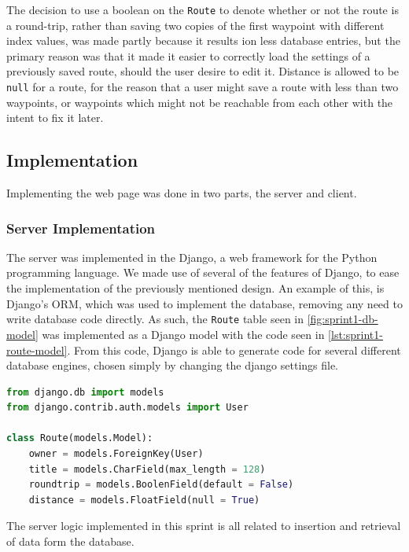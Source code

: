 The decision to use a boolean on the \texttt{Route} to denote whether or not the route is a round-trip, rather than saving two copies of the first waypoint with different index values, was made partly because it results ion less database entries, but the primary reason was that it made it easier to correctly load the settings of a previously saved route, should the user desire to edit it. Distance is allowed to be \texttt{null} for a route, for the reason that a user might save a route with less than two waypoints, or waypoints which might not be reachable from each other with the intent to fix it later.

\subsection{Implementation}

Implementing the web page was done in two parts, the server and client.

\subsubsection{Server Implementation}

The server was implemented in the Django\cite{djangoproject}, a web framework for the Python programming language. We made use of several of the features of Django, to ease the implementation of the previously mentioned design. An example of this, is Django's \ac{ORM}, which was used to implement the database, removing any need to write database code directly. As such, the \texttt{Route} table seen in \autoref{fig:sprint1-db-model} was implemented as a Django model with the code seen in \autoref{lst:sprint1-route-model}. From this code, Django is able to generate code for several different database engines, chosen simply by changing the django settings file.

\begin{lstlisting}[language=Python,label={lst:sprint1-route-model},caption={Sprint 1 "Route" Model}]
from django.db import models
from django.contrib.auth.models import User

class Route(models.Model):
	owner = models.ForeignKey(User)
	title = models.CharField(max_length = 128)
	roundtrip = models.BoolenField(default = False)
	distance = models.FloatField(null = True)
\end{lstlisting}

The server logic implemented in this sprint is all related to insertion and retrieval of data form the database.

